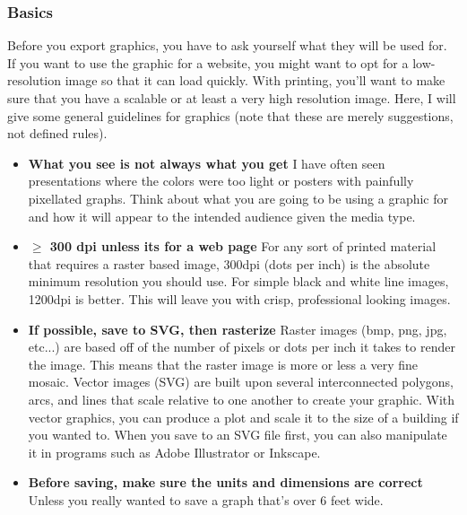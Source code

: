 \documentclass[letterpaper]{article}\usepackage[]{graphicx}\usepackage[]{color}
\newcommand{\tab}{\hspace*{1em}}
\begin{document}
\subsubsection{Basics}
\label{appendix:graphics:basics}
\tab\tab Before you export graphics, you have to ask yourself what they will be used for. If you want to use the graphic for a website, you might want to opt for a low-resolution image so that it can load quickly. With printing, you'll want to make sure that you have a scalable or at least a very high resolution image. Here, I will give some general guidelines for graphics (note that these are merely suggestions, not defined rules).
\begin{itemize}
  \item \textbf{What you see is not always what you get} I have often seen presentations where the colors were too light or posters with painfully pixellated graphs. Think about what you are going to be using a graphic for and how it will appear to the intended audience given the media type.
  \item \textbf{$\geq$ 300 dpi unless its for a web page} For any sort of printed material that requires a raster based image, 300dpi (dots per inch) is the absolute minimum resolution you should use. For simple black and white line images, 1200dpi is better. This will leave you with crisp, professional looking images.
  \item \textbf{If possible, save to SVG, then rasterize} Raster images (bmp, png, jpg, etc...) are based off of the number of pixels or dots per inch it takes to render the image. This means that the raster image is more or less a very fine mosaic. Vector images (SVG) are built upon several interconnected polygons, arcs, and lines that scale relative to one another to create your graphic. With vector graphics, you can produce a plot and scale it to the size of a building if you wanted to. When you save to an SVG file first, you can also manipulate it in programs such as Adobe Illustrator or Inkscape. 
  \item \textbf{Before saving, make sure the units and dimensions are correct} Unless you really wanted to save a graph that's over 6 feet wide.
\end{itemize}
\end{document}
